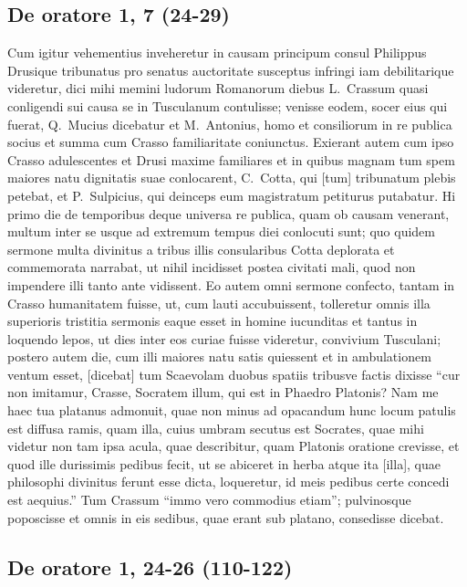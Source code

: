 \subsection*{De oratore 1, 7 (24-29)}

Cum igitur vehementius inveheretur in causam principum consul Philippus Drusique tribunatus pro senatus auctoritate susceptus infringi iam debilitarique videretur, dici mihi memini ludorum Romanorum diebus L.~Crassum quasi conligendi sui causa se in Tusculanum contulisse; venisse eodem, socer eius qui fuerat, Q.~Mucius dicebatur et M.~Antonius, homo et consiliorum in re publica socius et summa cum Crasso familiaritate coniunctus. Exierant autem cum ipso Crasso adulescentes et Drusi maxime familiares et in quibus magnam tum spem maiores natu dignitatis suae conlocarent, C.~Cotta, qui [tum] tribunatum plebis petebat, et P.~Sulpicius, qui deinceps eum magistratum petiturus putabatur.  Hi primo die de temporibus deque universa re publica, quam ob causam venerant, multum inter se usque ad extremum tempus diei conlocuti sunt; quo quidem sermone multa divinitus a tribus illis consularibus Cotta deplorata et commemorata narrabat, ut nihil incidisset postea civitati mali, quod non impendere illi tanto ante vidissent. Eo autem omni sermone confecto, tantam in Crasso humanitatem fuisse, ut, cum lauti accubuissent, tolleretur omnis illa superioris tristitia sermonis eaque esset in homine iucunditas et tantus in loquendo lepos, ut dies inter eos curiae fuisse videretur, convivium Tusculani; postero autem die, cum illi maiores natu satis quiessent et in ambulationem ventum esset, [dicebat] tum Scaevolam duobus spatiis tribusve factis dixisse ``cur non imitamur, Crasse, Socratem illum, qui est in Phaedro Platonis? Nam me haec tua platanus admonuit, quae non minus ad opacandum hunc locum patulis est diffusa ramis, quam illa, cuius umbram secutus est Socrates, quae mihi videtur non tam ipsa acula, quae describitur, quam Platonis oratione crevisse, et quod ille durissimis pedibus fecit, ut se abiceret in herba atque ita [illa], quae philosophi divinitus ferunt esse dicta, loqueretur, id meis pedibus certe concedi est aequius.'' Tum Crassum ``immo vero commodius etiam''; pulvinosque poposcisse et omnis in eis sedibus, quae erant sub platano, consedisse dicebat.

\subsection*{De oratore 1, 24-26 (110-122)}

